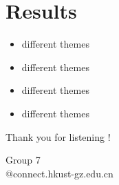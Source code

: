 \documentclass[serif, aspectratio=169]{beamer}
\begin{document}







\section{Results}
\begin{frame}
    \begin{itemize}
        \item different themes
        \item different themes
        \item different themes
        \item different themes
    \end{itemize}
\end{frame}


\begin{frame}
\begin{center}
{ Thank you for listening !}
\vspace{1cm}

Group 7 \\[1em]
@connect.hkust-gz.edu.cn 
\end{center}
\end{frame}
\end{document}

